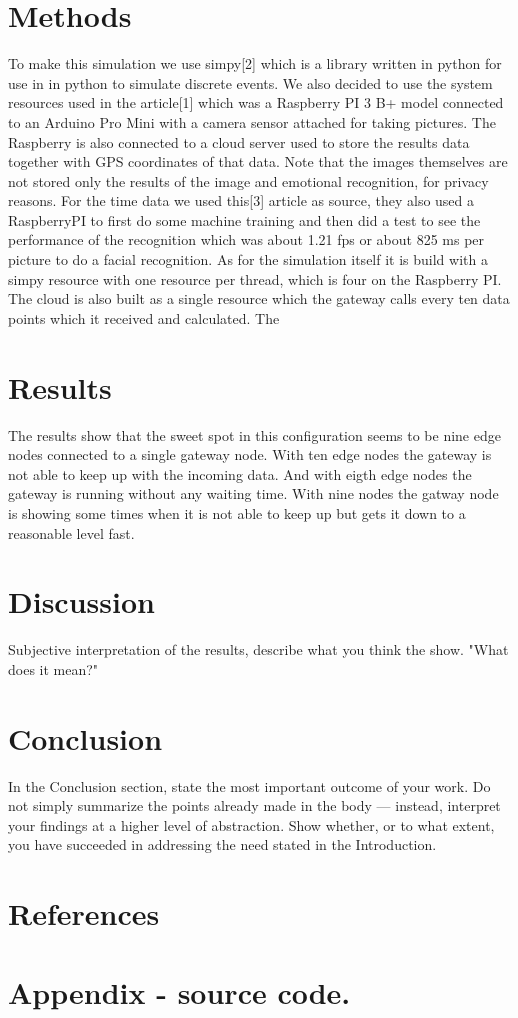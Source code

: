 \documentclass[a4paper,11pt,notitlepage,twocolumn]{article}
\begin{document}
  \section{Methods}
    To make this simulation we use simpy[2] which is a library written in python for use in
    in python to simulate discrete events. We also decided to use the system resources used
    in the article[1] which was a Raspberry PI 3 B+ model connected to an Arduino Pro Mini
    with a camera sensor attached for taking pictures. The Raspberry is also connected to a
    cloud server used to store the results data together with GPS coordinates of that data.
    Note that the images themselves are not stored only the results of the image and
    emotional recognition, for privacy reasons. For the time data we used this[3] article as
    source, they also used a RaspberryPI to first do some machine training and then did a test
    to see the performance of the recognition which was about 1.21 fps or about 825 ms per
    picture to do a facial recognition. As for the simulation itself it is build with a 
    simpy resource with one resource per thread, which is four on the Raspberry PI. The
    cloud is also built as a single resource which the gateway calls every ten data points
    which it received and calculated. The 
  
  \section{Results}
    The results show that the sweet spot in this configuration seems to be nine edge nodes
    connected to a single gateway node. With ten edge nodes the gateway is not able to keep
    up with the incoming data. And with eigth edge nodes the gateway is running without any
    waiting time. With nine nodes the gatway node is showing some times when it is not able
    to keep up but gets it down to a reasonable level fast.
    
  \section{Discussion}
    Subjective interpretation of the results, describe what you think the show.
    "What does it mean?"
    
  \section{Conclusion}
    In the Conclusion section, state the most important outcome of your work. Do not simply
    summarize the points already made in the body — instead, interpret your findings at a
    higher level of abstraction. Show whether, or to what extent, you have succeeded in
    addressing the need stated in the Introduction.
    
  \section{References}
    

  \onecolumn
  \section{Appendix - source code.}
\end{document}

